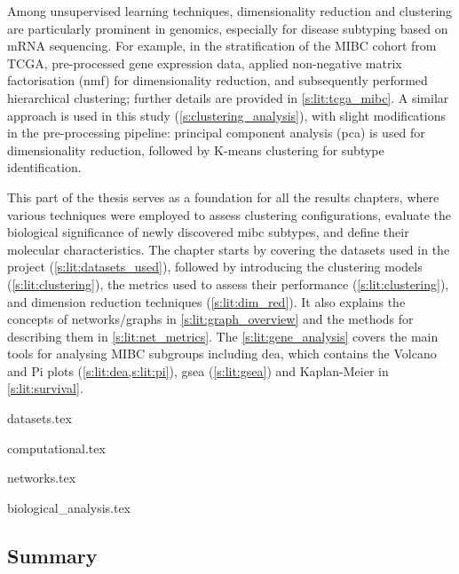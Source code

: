 Among unsupervised learning techniques, dimensionality reduction and clustering are particularly prominent in genomics, especially for disease subtyping based on mRNA sequencing. For example, in the stratification of the MIBC cohort from TCGA, \citet{Robertson2017-mg} pre-processed gene expression data, applied non-negative matrix factorisation (\acrshort{nmf}) for dimensionality reduction, and subsequently performed hierarchical clustering; further details are provided in \cref{s:lit:tcga_mibc}. A similar approach is used in this study (\cref{s:clustering_analysis}), with slight modifications in the pre-processing pipeline: principal component analysis (\acrshort{pca}) is used for dimensionality reduction, followed by K-means clustering for subtype identification.

This part of the thesis serves as a foundation for all the results chapters, where various techniques were employed to assess clustering configurations, evaluate the biological significance of newly discovered \acrshort{mibc} subtypes, and define their molecular characteristics. The chapter starts by covering the datasets used in the project (\cref{s:lit:datasets_used}), followed by introducing the clustering models (\cref{s:lit:clustering}), the metrics used to assess their performance (\cref{s:lit:clustering}), and dimension reduction techniques (\cref{s:lit:dim_red}). It also explains the concepts of networks/graphs in \cref{s:lit:graph_overview} and the methods for describing them in \cref{s:lit:net_metrics}. The \cref{s:lit:gene_analysis} covers the main tools for analysing MIBC subgroups including \acrfull{dea}, which contains the Volcano and Pi plots (\cref{s:lit:dea,s:lit:pi}), \acrfull{gsea} (\cref{s:lit:gsea}) and Kaplan-Meier in \cref{s:lit:survival}.


{datasets.tex}

{computational.tex}

{networks.tex}

{biological_analysis.tex}



\subsection{Summary} \label{s:lit:choosing_ml}


